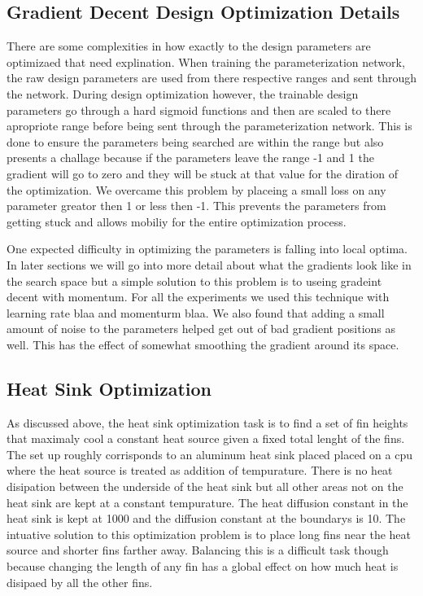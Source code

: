\documentclass{article} %
\begin{document}
\subsection{Gradient Decent Design Optimization Details}

There are some complexities in how exactly to the design parameters are optimizaed that need explination. When training the parameterization network, the raw design parameters are used from there respective ranges and sent through the network. During design optimization however, the trainable design parameters go through a hard sigmoid functions and then are scaled to there apropriote range before being sent through the parameterization network. This is done to ensure the parameters being searched are within the range but also presents a challage because if the parameters leave the range -1 and 1 the gradient will go to zero and they will be stuck at that value for the diration of the optimization. We overcame this problem by placeing a small loss on any parameter greator then 1 or less then -1. This prevents the parameters from getting stuck and allows mobiliy for the entire optimization process.

One expected difficulty in optimizing the parameters is falling into local optima. In later sections we will go into more detail about what the gradients look like in the search space but a simple solution to this problem is to useing gradeint decent with momentum. For all the experiments we used this technique with learning rate blaa and momenturm blaa. We also found that adding a small amount of noise to the parameters helped get out of bad gradient positions as well. This has the effect of somewhat smoothing the gradient around its space.

\subsection{Heat Sink Optimization}

As discussed above, the heat sink optimization task is to find a set of fin heights that maximaly cool a constant heat source given a fixed total lenght of the fins. The set up roughly corrisponds to an aluminum heat sink placed placed on a cpu where the heat source is treated as addition of tempurature. There is no heat disipation between the underside of the heat sink but all other areas not on the heat sink are kept at a constant tempurature. The heat diffusion constant in the heat sink is kept at 1000 and the diffusion constant at the boundarys is 10. The intuative solution to this optimization problem is to place long fins near the heat source and shorter fins farther away. Balancing this is a difficult task though because changing the length of any fin has a global effect on how much heat is disipaed by all the other fins. 
\end{document}
